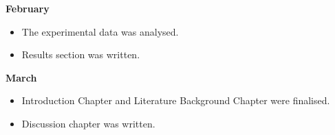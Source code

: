 \documentclass{l4proj}
\begin{document}
\begin{appendices}
{\bfseries February}
\begin{itemize}
	\item The experimental data was analysed.
	\item Results section was written.
\end{itemize}

{\bfseries March}
\begin{itemize}
	\item Introduction Chapter and Literature Background Chapter were finalised.
	\item Discussion chapter was written.
\end{itemize}

\end{appendices}



\end{document}
